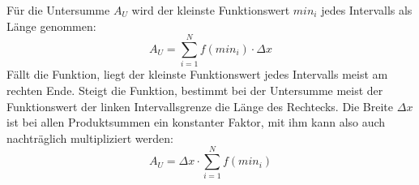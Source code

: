 \begin{figure}[h!]
\end{figure}

F\"{u}r die Untersumme $A_U$ wird der kleinste Funktionswert $min_i$ jedes Intervalls als L\"{a}nge genommen: $$A_U = \sum_{i=1}^{N} f(min_i) \cdot \Delta x$$ F\"{a}llt die Funktion, liegt der kleinste Funktionswert jedes Intervalls meist am rechten Ende. Steigt die Funktion, bestimmt bei der Untersumme meist der Funktionswert der linken Intervallsgrenze die L\"{a}nge des Rechtecks. Die Breite $\Delta x$ ist bei allen Produktsummen ein konstanter Faktor, mit ihm kann also auch nachtr\"{a}glich multipliziert werden: $$A_U = \Delta x \cdot \sum_{i=1}^{N} f(min_i)$$

\pagebreak


